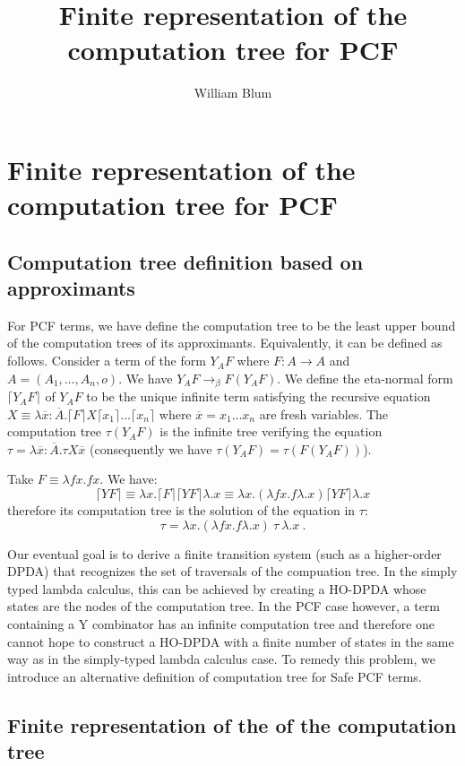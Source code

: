 \documentclass{article}
\author{William Blum}
\title{Finite representation of the computation tree for PCF}
\newcommand{\aux}[1]{\lceil #1\rceil}
\newcommand{\betared}{\rightarrow_\beta}
\newcommand{\syneq}{\equiv}
\begin{document}
\maketitle

\section{Finite representation of the computation tree for PCF}

\subsection{Computation tree definition based on approximants}
For PCF terms, we have define the computation tree to be the least upper bound of the computation trees of its approximants. Equivalently, it can be defined as follows. Consider a term of the form $Y_A F$ where $F:A\rightarrow A$ and $A = (A_1,\ldots,A_n,o)$.
We have $Y_A F \betared F (Y_A F)$.
We define the eta-normal form $\aux{Y_A F}$ of $Y_A F$ to be the unique infinite term satisfying the recursive equation $X \syneq \lambda \overline{x}: \overline{A} . \aux{F} X \aux{x_1} \ldots \aux{x_n} $
where $\overline{x} = x_1 \ldots x_n$ are fresh variables.
The computation tree $\tau(Y_A F)$ is the infinite tree verifying the equation 
$\tau =  \lambda \overline{x}: \overline{A} . \tau X \overline{x}$ (consequently we have $\tau(Y_A F) = \tau(F (Y_A F))$).

Take $F \syneq \lambda f x. f x$. We have:
$$\aux{Y F} \syneq \lambda x . \aux{F} \aux{Y F} \lambda.x \syneq \lambda x. (\lambda f x. f \lambda.x ) \aux{Y F} \lambda.x$$ therefore its computation tree is the solution of the equation in $\tau$: $$\tau = \lambda x . (\lambda f x. f \lambda.x) \ \tau \ \lambda.x \ .$$


Our eventual goal is to derive a finite transition system (such as a higher-order DPDA) that recognizes the set of traversals of the compuation tree. In the simply typed lambda calculus, this can be achieved by creating a HO-DPDA whose states are the nodes of the computation tree.
In the PCF case however, a term containing a Y combinator has an infinite computation tree and therefore one cannot hope to
 construct a HO-DPDA with a finite number of states in the same way as in the
simply-typed lambda calculus case.
To remedy this problem, we introduce an alternative definition of computation tree for Safe PCF terms.

\subsection{Finite representation of the of the computation tree}
\end{document}
